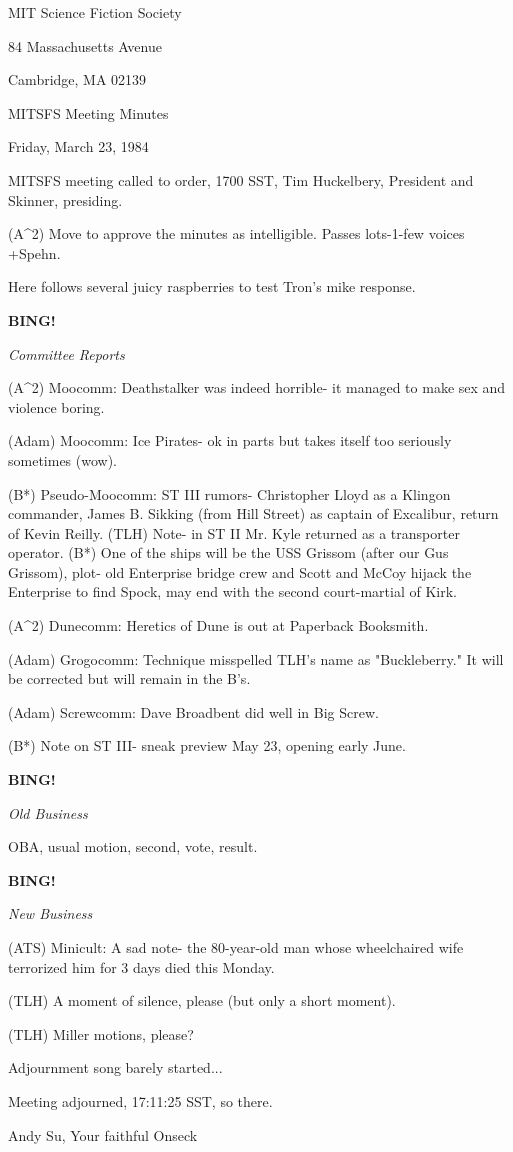 \documentclass[12pt]{article}
\newcommand{\bing}{{\bf BING!} }
\newcommand{\goto}[1]{\bing \vskip 12pt \centerline{{\em{#1}}}}
\begin{document}
\begin{center}

MIT Science Fiction Society 

84 Massachusetts Avenue

Cambridge, MA 02139

\vspace{12pt}

MITSFS Meeting Minutes 

Friday, March 23, 1984

\end{center}
 
\vspace{18pt}

\setlength{\parskip}{6pt}

\noindent
MITSFS meeting called to order, 1700 SST,
Tim Huckelbery, President and Skinner, presiding.

(A^2) Move to approve the minutes as intelligible. Passes lots-1-few voices +Spehn.

Here follows several juicy raspberries to test Tron's mike response.

\goto{Committee Reports}

(A^2) Moocomm: Deathstalker was indeed horrible- it managed to make sex and violence boring.

(Adam) Moocomm: Ice Pirates- ok in parts but takes itself too seriously sometimes (wow).

(B*) Pseudo-Moocomm: ST III rumors- Christopher Lloyd as a Klingon commander, James B. Sikking (from Hill Street) as captain of Excalibur, return of Kevin Reilly. (TLH) Note- in ST II Mr. Kyle returned as a transporter operator. (B*) One of the ships will be the USS Grissom (after our Gus Grissom), plot- old Enterprise bridge crew and Scott and McCoy hijack the Enterprise to find Spock, may end with the second court-martial of Kirk.

(A^2) Dunecomm: Heretics of Dune is out at Paperback Booksmith.

(Adam) Grogocomm: Technique misspelled TLH's name as "Buckleberry." It will be corrected but will remain in the B's.

(Adam) Screwcomm: Dave Broadbent did well in Big Screw.

(B*) Note on ST III- sneak preview May 23, opening early June.

\goto{Old Business}

OBA, usual motion, second, vote, result.

\goto{New Business}

(ATS) Minicult: A sad note- the 80-year-old man whose wheelchaired wife terrorized him for 3 days died this Monday.

(TLH) A moment of silence, please (but only a short moment).

(TLH) Miller motions, please?

Adjournment song barely started...

\vspace{12pt}

\noindent
Meeting adjourned, 17:11:25 SST, so there.

\vspace{18pt}

\centerline{Andy Su, Your faithful Onseck}
\end{document}
